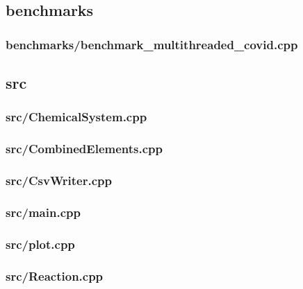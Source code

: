 \subsection{benchmarks}
\subsubsection{benchmarks/benchmark\_multithreaded\_covid.cpp}

\newpage
\subsection{src}
\subsubsection{src/ChemicalSystem.cpp}

\newpage
\subsubsection{src/CombinedElements.cpp}

\newpage
\subsubsection{src/CsvWriter.cpp}

\newpage
\subsubsection{src/main.cpp}

\newpage
\subsubsection{src/plot.cpp}

\newpage
\subsubsection{src/Reaction.cpp} \label{subsec:reaction}

\newpage
